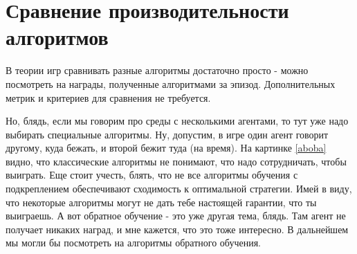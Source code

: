 \chapter{Сравнение производительности алгоритмов}

В теории игр сравнивать разные алгоритмы достаточно просто - можно посмотреть на награды, полученные алгоритмами за эпизод.
Дополнительных метрик и критериев для сравнения не требуется.

Но, блядь, если мы говорим про среды с несколькими агентами, то тут уже надо выбирать специальные алгоритмы. Ну, допустим, в игре один агент говорит другому, куда бежать, и второй бежит туда (на время). На картинке \ref{aboba} \cite{https://doi.org/10.48550/arxiv.1509.02971} видно, что классические алгоритмы не понимают, что надо сотрудничать, чтобы выиграть.
Еще стоит учесть, блять, что не все алгоритмы обучения с подкреплением обеспечивают сходимость к оптимальной стратегии. Имей в виду, что некоторые алгоритмы могут не дать тебе настоящей гарантии, что ты выиграешь. А вот обратное обучение - это уже другая тема, блядь. Там агент не получает никаких наград, и мне кажется, что это тоже интересно. В дальнейшем мы могли бы посмотреть на алгоритмы обратного обучения.

